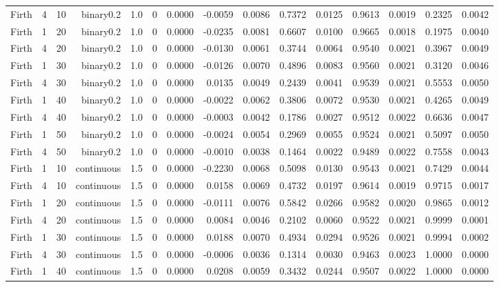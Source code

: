 \begin{longtable}{rrrrrrrrrrrrrrr}
  Firth & 4 & 10 & binary0.2 & 1.0 & 0 & 0.0000 & -0.0059 & 0.0086 & 0.7372 & 0.0125 & 0.9613 & 0.0019 & 0.2325 & 0.0042 \\ 
  Firth & 1 & 20 & binary0.2 & 1.0 & 0 & 0.0000 & -0.0235 & 0.0081 & 0.6607 & 0.0100 & 0.9665 & 0.0018 & 0.1975 & 0.0040 \\ 
  Firth & 4 & 20 & binary0.2 & 1.0 & 0 & 0.0000 & -0.0130 & 0.0061 & 0.3744 & 0.0064 & 0.9540 & 0.0021 & 0.3967 & 0.0049 \\ 
  Firth & 1 & 30 & binary0.2 & 1.0 & 0 & 0.0000 & -0.0126 & 0.0070 & 0.4896 & 0.0083 & 0.9560 & 0.0021 & 0.3120 & 0.0046 \\ 
  Firth & 4 & 30 & binary0.2 & 1.0 & 0 & 0.0000 & 0.0135 & 0.0049 & 0.2439 & 0.0041 & 0.9539 & 0.0021 & 0.5553 & 0.0050 \\ 
  Firth & 1 & 40 & binary0.2 & 1.0 & 0 & 0.0000 & -0.0022 & 0.0062 & 0.3806 & 0.0072 & 0.9530 & 0.0021 & 0.4265 & 0.0049 \\ 
  Firth & 4 & 40 & binary0.2 & 1.0 & 0 & 0.0000 & -0.0003 & 0.0042 & 0.1786 & 0.0027 & 0.9512 & 0.0022 & 0.6636 & 0.0047 \\ 
  Firth & 1 & 50 & binary0.2 & 1.0 & 0 & 0.0000 & -0.0024 & 0.0054 & 0.2969 & 0.0055 & 0.9524 & 0.0021 & 0.5097 & 0.0050 \\ 
  Firth & 4 & 50 & binary0.2 & 1.0 & 0 & 0.0000 & -0.0010 & 0.0038 & 0.1464 & 0.0022 & 0.9489 & 0.0022 & 0.7558 & 0.0043 \\ 
  Firth & 1 & 10 & continuous & 1.5 & 0 & 0.0000 & -0.2230 & 0.0068 & 0.5098 & 0.0130 & 0.9543 & 0.0021 & 0.7429 & 0.0044 \\ 
  Firth & 4 & 10 & continuous & 1.5 & 0 & 0.0000 & 0.0158 & 0.0069 & 0.4732 & 0.0197 & 0.9614 & 0.0019 & 0.9715 & 0.0017 \\ 
  Firth & 1 & 20 & continuous & 1.5 & 0 & 0.0000 & -0.0111 & 0.0076 & 0.5842 & 0.0266 & 0.9582 & 0.0020 & 0.9865 & 0.0012 \\ 
  Firth & 4 & 20 & continuous & 1.5 & 0 & 0.0000 & 0.0084 & 0.0046 & 0.2102 & 0.0060 & 0.9522 & 0.0021 & 0.9999 & 0.0001 \\ 
  Firth & 1 & 30 & continuous & 1.5 & 0 & 0.0000 & 0.0188 & 0.0070 & 0.4934 & 0.0294 & 0.9526 & 0.0021 & 0.9994 & 0.0002 \\ 
  Firth & 4 & 30 & continuous & 1.5 & 0 & 0.0000 & -0.0006 & 0.0036 & 0.1314 & 0.0030 & 0.9463 & 0.0023 & 1.0000 & 0.0000 \\ 
  Firth & 1 & 40 & continuous & 1.5 & 0 & 0.0000 & 0.0208 & 0.0059 & 0.3432 & 0.0244 & 0.9507 & 0.0022 & 1.0000 & 0.0000 \\ 

\end{longtable}
